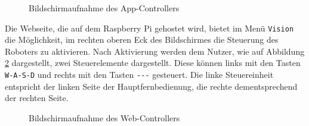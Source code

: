 \begin{figure}[h]
    \caption{Bildschirmaufnahme des App-Controllers}\label{fig:app-controller}
\end{figure}


Die Webseite, die auf dem Raspberry Pi gehostet wird, bietet im Menü \texttt{Vision} die Möglichkeit, im rechten
oberen Eck des Bildschirmes die Steuerung des Roboters zu aktivieren.
Nach Aktivierung werden dem Nutzer, wie auf Abbildung \ref{fig:web-controller} dargestellt, zwei Steuerelemente dargestellt.
Diese können links mit den Tasten \texttt{W-A-S-D} und rechts mit den Tasten \texttt{\textuparrow -\textleftarrow -\textdownarrow -\textrightarrow}
gesteuert.
Die linke Steuereinheit entspricht der linken Seite der Hauptfernbedienung, die rechte dementsprechend der rechten Seite.

\begin{figure}[h]
    \caption{Bildschirmaufnahme des Web-Controllers}\label{fig:web-controller}
\end{figure}


